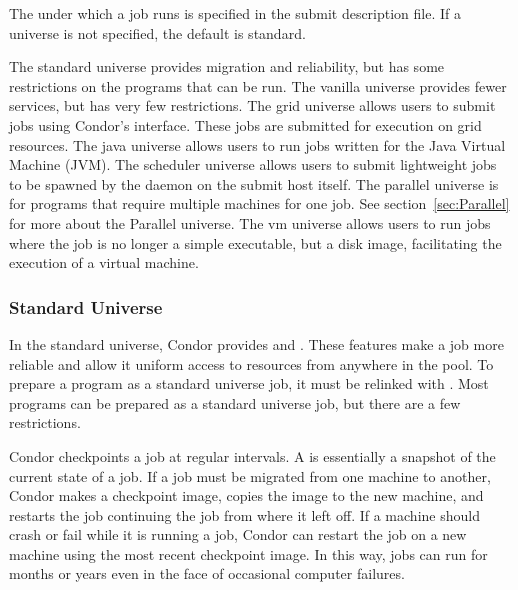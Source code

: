 The  under which a job runs
is specified in the submit description file.
If a universe is not specified, the default is standard.

The standard universe provides migration and reliability, but has some
restrictions on the programs that can be run. 
The vanilla universe provides fewer services, but has very few
restrictions.
The grid universe allows users to submit 
jobs using Condor's interface.
These jobs are submitted for execution on grid resources.
The java universe allows users to run jobs written for the
Java Virtual Machine (JVM).
The scheduler universe allows users to submit lightweight jobs
to be spawned by the  daemon on the submit host itself.
The parallel universe is for programs that require multiple machines
for one job.
See section~\ref{sec:Parallel} for more about the Parallel universe.
The vm universe allows users to run jobs where the job is
no longer a simple executable, but a disk image, facilitating
the execution of a virtual machine.

\subsubsection{\label{sec:standard-universe}Standard Universe}

In the standard universe, Condor provides  and
.  These features make a job more reliable
and allow it uniform access to resources from anywhere in the pool.
To prepare a program as a standard universe job, it must be relinked
with .  Most programs can be prepared as a standard
universe job, but there are a few restrictions.

Condor checkpoints a job at regular intervals.
A  is essentially a snapshot of the current
state of a job. 
If a job must be migrated from one machine to another,
Condor makes a checkpoint image, copies the image to the new machine,
and restarts the job continuing the job from where it left off.
If a machine should
crash or fail while it is running a job, Condor can restart the job on
a new machine using the most recent checkpoint image.
In this way, jobs
can run for months or years even in the face of occasional computer failures.

